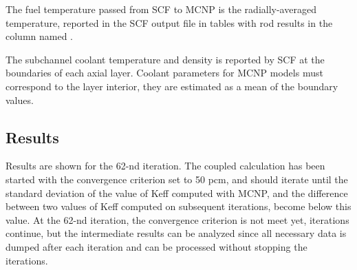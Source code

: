 \documentclass[a4paper,10pt,twocolumn,english]{sphinxsnamc2013}
\begin{document}
The fuel temperature passed from SCF to MCNP is the radially-averaged
temperature, reported in the SCF output file in tables with rod results in the
column named .

The subchannel coolant temperature and density is reported by SCF at the
boundaries of each axial layer. Coolant parameters for MCNP models must
correspond to the layer interior, they are estimated as a mean of the boundary
values.


\subsection{Results}
\label{paper:results}
Results are shown for the 62-nd iteration. The coupled calculation has been
started with the convergence criterion set to 50 pcm, and should
iterate until the standard deviation of the value of Keff computed with MCNP, and the
difference between two values of Keff computed on subsequent iterations, become
below this value. At the 62-nd iteration, the convergence criterion is not meet yet,
iterations continue, but the intermediate results can be analyzed since all
necessary data is dumped after each iteration and can be processed without
stopping the iterations.
\end{document}
